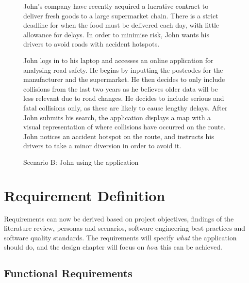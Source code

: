\documentclass[authoryearcitations]{UoYCSproject}
\begin{document}
\begin{figure}
	\begin{framed}
 		John's company have recently acquired a lucrative contract to deliver fresh goods to a large supermarket chain. There is a strict deadline for when the food must be delivered each day, with little allowance for delays. In order to minimise risk, John wants his drivers to avoid roads with accident hotspots.
 		
 		John logs in to his laptop and accesses an online application for analysing road safety. He begins by inputting the postcodes for the manufacturer and the supermarket. He then decides to only include collisions from the last two years as he believes older data will be less relevant due to road changes. He decides to include serious and fatal collisions only, as these are likely to cause lengthy delays. After John submits his search, the application displays a map with a visual representation of where collisions have occurred on the route. John notices an accident hotspot on the route, and instructs his drivers to take a minor diversion in order to avoid it.
  	\end{framed}
  \caption{Scenario B: John using the application}
  \label{fig:scenarioB}
\end{figure}



\section{Requirement Definition}

Requirements can now be derived based on project objectives, findings of the literature review, personas and scenarios, software engineering best practices and software quality standards. The requirements will specify \textit{what} the application should do, and the design chapter will focus on \textit{how} this can be achieved.


\subsection{Functional Requirements}
\end{document}
